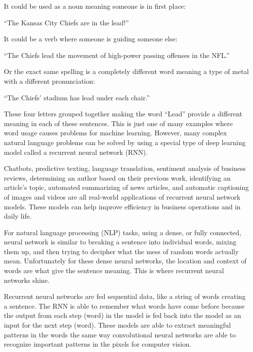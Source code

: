 \documentclass[5p,authoryear]{elsarticle}
\begin{document}
It could be used as a noun meaning someone is in first place: 

\begin{displayquote}
“The Kansas City Chiefs are in the lead!”
\end{displayquote}


It could be a verb where someone is guiding someone else:

\begin{displayquote}
“The Chiefs lead the movement of high-power passing offenses in the NFL.”
\end{displayquote}


Or the exact same spelling is a completely different word meaning a type of metal with a different pronunciation: 

\begin{displayquote}
“The Chiefs’ stadium has lead under each chair.”
\end{displayquote}


These four letters grouped together making the word “Lead” provide a different meaning in each of these sentences. This is just one of many examples where word usage causes problems for machine learning. However, many complex natural language problems can be solved by using a special type of deep learning model called a recurrent neural network (RNN). 

Chatbots, predictive texting, language translation, sentiment analysis of business reviews, determining an author based on their previous work, identifying an article’s topic, automated summarizing of news articles, and automatic captioning of images and videos are all real-world applications of recurrent neural network models. These models can help improve efficiency in business operations and in daily life.

For natural language processing (NLP) tasks, using a dense, or fully connected, neural network is similar to breaking a sentence into individual words, mixing them up, and then trying to decipher what the mess of random words actually mean. Unfortunately for these dense neural networks, the location and context of words are what give the sentence meaning. This is where recurrent neural networks shine.

Recurrent neural networks are fed sequential data, like a string of words creating a sentence. The RNN is able to remember what words have come before because the output from each step (word) in the model is fed back into the model as an input for the next step (word). These models are able to extract meaningful patterns in the words the same way convolutional neural networks are able to recognize important patterns in the pixels for computer vision. 
\end{document}
